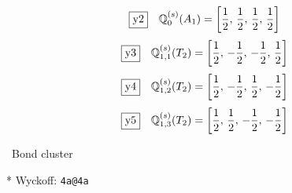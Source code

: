 \documentclass[fleqn,10pt,landscape]{jsarticle}
\begin{document}
\begin{dmath*}
\fbox{y2}\quad \mathbb{Q}_{0}^{(s)}(A_{1})=\left[ \frac{1}{2},\, \frac{1}{2},\, \frac{1}{2},\, \frac{1}{2} \right]
\end{dmath*}
\begin{dmath*}
\fbox{y3}\quad \mathbb{Q}_{1,1}^{(s)}(T_{2})=\left[ \frac{1}{2},\, - \frac{1}{2},\, - \frac{1}{2},\, \frac{1}{2} \right]
\end{dmath*}
\begin{dmath*}
\fbox{y4}\quad \mathbb{Q}_{1,2}^{(s)}(T_{2})=\left[ \frac{1}{2},\, - \frac{1}{2},\, \frac{1}{2},\, - \frac{1}{2} \right]
\end{dmath*}
\begin{dmath*}
\fbox{y5}\quad \mathbb{Q}_{1,3}^{(s)}(T_{2})=\left[ \frac{1}{2},\, \frac{1}{2},\, - \frac{1}{2},\, - \frac{1}{2} \right]
\end{dmath*}
\vspace{5mm}

\noindent\textbullet\, Bond cluster

\vspace{5mm}

\noindent ** Wyckoff: \texttt{4a@4a}
\end{document}
